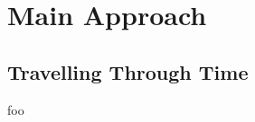 \documentclass[xcolor=dvipsnames]{beamer}
\begin{document}
\section{Main Approach}

\subsection{Travelling Through Time}


\begin{frame}{foo}
\end{frame}


\end{document}
